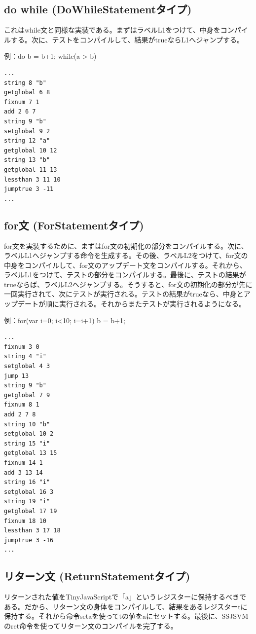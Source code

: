 \documentclass[12pt]{article}
\begin{document}
\subsection{do while (DoWhileStatementタイプ)}
これはwhile文と同様な実装である。まずはラベルL1をつけて、中身をコンパイルする。次に、テストをコンパイルして、結果がtrueならL1へジャンプする。

例：do b = b+1; while(a > b)\\

\begin{lstlisting}
...
string 8 "b"
getglobal 6 8
fixnum 7 1
add 2 6 7
string 9 "b"
setglobal 9 2
string 12 "a"
getglobal 10 12
string 13 "b"
getglobal 11 13
lessthan 3 11 10
jumptrue 3 -11
...
\end{lstlisting}

\subsection{for文 (ForStatementタイプ)}
for文を実装するために、まずはfor文の初期化の部分をコンパイルする。次に、ラベルL1へジャンプする命令を生成する。その後、ラベルL2をつけて、for文の中身をコンパイルして、for文のアップデート文をコンパイルする。それから、ラベルL1をつけて、テストの部分をコンパイルする。最後に、テストの結果がtrueならば、ラベルL2へジャンプする。そうすると、for文の初期化の部分が先に一回実行されて、次にテストが実行される。テストの結果がtrueなら、中身とアップデートが順に実行される。それからまたテストが実行されるようになる。

例：for(var i=0; i<10; i=i+1) b = b+1;\\

\begin{lstlisting}
...
fixnum 3 0
string 4 "i"
setglobal 4 3
jump 13
string 9 "b"
getglobal 7 9
fixnum 8 1
add 2 7 8
string 10 "b"
setglobal 10 2
string 15 "i"
getglobal 13 15
fixnum 14 1
add 3 13 14
string 16 "i"
setglobal 16 3
string 19 "i"
getglobal 17 19
fixnum 18 10
lessthan 3 17 18
jumptrue 3 -16
...
\end{lstlisting}

\subsection{リターン文 (ReturnStatementタイプ)}
リターンされた値をTinyJavaScriptで「a」というレジスターに保持するべきである。だから、リターン文の身体をコンパイルして、結果をあるレジスターtに保持する。それから命令setaを使ってtの値をaにセットする。最後に、SSJSVMのret命令を使ってリターン文のコンパイルを完了する。
\end{document}
